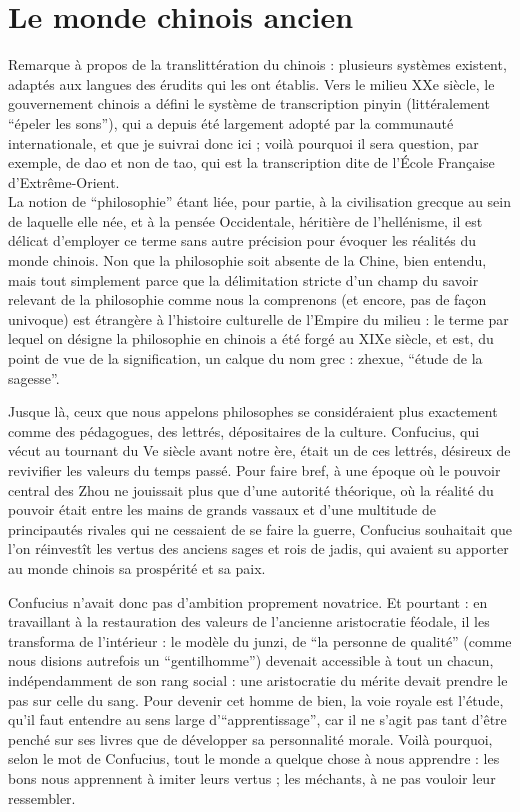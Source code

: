 \documentclass[11pt,a4paper]{article} %
\begin{document}
\part{Le monde chinois ancien}

Remarque à propos de la translittération du chinois : plusieurs systèmes existent, adaptés
aux langues des érudits qui les ont établis.
Vers le milieu XXe siècle, le gouvernement
chinois a défini le système de transcription pinyin (littéralement ``épeler les sons''), qui a
depuis été largement adopté par la communauté internationale, et que je suivrai donc ici ;
voilà pourquoi il sera question, par exemple, de dao et non de tao, qui est la transcription
dite de l'École Française d'Extrême-Orient.\\

La notion de ``philosophie'' étant liée, pour partie, à la civilisation grecque au sein de
laquelle elle née, et à la pensée Occidentale, héritière de l'hellénisme, il est délicat
d'employer ce terme sans autre précision pour évoquer les réalités du monde chinois.
Non
que la philosophie soit absente de la Chine, bien entendu, mais tout simplement parce que
la délimitation stricte d'un champ du savoir relevant de la philosophie comme nous la
comprenons (et encore, pas de façon univoque) est étrangère à l'histoire culturelle de
l'Empire du milieu : le terme par lequel on désigne la philosophie en chinois a été forgé
au XIXe siècle, et est, du point de vue de la signification, un calque du nom grec : zhexue,
``étude de la sagesse''.

Jusque là, ceux que nous appelons philosophes se considéraient plus exactement comme
des pédagogues, des lettrés, dépositaires de la culture.
Confucius, qui vécut au
tournant du Ve siècle avant notre ère, était un de ces lettrés, désireux de revivifier les
valeurs du temps passé.
Pour faire bref, à une époque où le pouvoir central des Zhou ne
jouissait plus que d'une autorité théorique, où la réalité du pouvoir était entre les mains de
grands vassaux et d'une multitude de principautés rivales qui ne cessaient de se faire la
guerre, Confucius souhaitait que l'on réinvestît les vertus des anciens sages et rois de
jadis, qui avaient su apporter au monde chinois sa prospérité et sa paix.

Confucius n'avait donc pas d'ambition proprement novatrice.
Et pourtant : en travaillant à
la restauration des valeurs de l'ancienne aristocratie féodale, il les transforma de
l'intérieur : le modèle du junzi, de ``la personne de qualité'' (comme nous disions
autrefois un ``gentilhomme'') devenait accessible à tout un chacun, indépendamment de son
rang social : une aristocratie du mérite devait prendre le pas sur celle du sang.
Pour devenir
cet homme de bien, la voie royale est l'étude, qu'il faut entendre au sens large
d'``apprentissage'', car il ne s'agit pas tant d'être penché sur ses livres que de développer
sa personnalité morale.
Voilà pourquoi, selon le mot de Confucius, tout le monde a
quelque chose à nous apprendre : les bons nous apprennent à imiter leurs vertus ; les
méchants, à ne pas vouloir leur ressembler.
\end{document}
